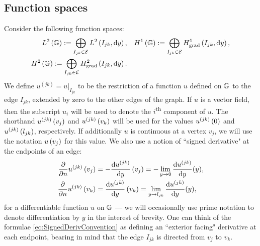 \subsection{Function spaces} \label{ssec:FunctionSpaces}
Consider the following function spaces:
\begin{subequations} \label{eq:GraphFuncSpaces}
	\begin{align}
		L^2\left( \mathbb{G} \right) := \bigoplus_{I_{jk}\in \mathcal{E}} L^{2}\left( I_{jk},\mathrm{d}y \right),
		&\quad H^1\left( \mathbb{G} \right) := \bigoplus_{I_{jk}\in \mathcal{E}} H^1_\mathrm{grad}\left( I_{jk}, \mathrm{d}y \right), \\
		H^2\left( \mathbb{G} \right) := \bigoplus_{I_{jk}\in \mathcal{E}} H^2_\mathrm{grad}\left( I_{jk}, \mathrm{d} y \right). &
	\end{align}
\end{subequations}
We define $u^{(jk)} = u\vert_{I_{jk}}$ to be the restriction of a function $u$ defined on $\mathbb{G}$ to the edge $I_{jk}$, extended by zero to the other edges of the graph. 
If $u$ is a vector field, then the subscript $u_{i}$ will be used to denote the $i$\textsuperscript{th} component of $u$.
The shorthand $u^{(jk)}\left( v_j \right)$ and $u^{(jk)}\left( v_k \right)$ will be used for the values $u^{(jk)}\left( 0 \right)$ and $u^{(jk)}\left( l_{jk} \right)$, respectively.
If additionally $u$ is continuous at a vertex $v_j$, we will use the notation $u\left( v_j \right)$ for this value.
We also use a notion of ``signed derivative" at the endpoints of an edge:
\begin{subequations} \label{eq:SignedDerivConvention}
	\begin{align}
		\dfrac{\partial }{\partial n}u^{(jk)}\left( v_j \right) &= -\dfrac{\mathrm{d}u^{(jk)}}{\mathrm{d}y}\left( v_j \right) = -\lim_{y\rightarrow0}\dfrac{\mathrm{d}u^{(jk)}}{\mathrm{d}y}(y), \\
		\dfrac{\partial }{\partial n}u^{(jk)}\left( v_k \right) &= \dfrac{\mathrm{d}u^{(jk)}}{\mathrm{d}y}\left( v_k \right) = \lim_{y\rightarrow l_{jk}}\dfrac{\mathrm{d}u^{(jk)}}{\mathrm{d}y}(y),
	\end{align}
\end{subequations}
for a differentiable function $u$ on $\mathbb{G}$ --- we will occasionally use prime notation to denote differentiation by $y$ in the interest of brevity.
One can think of the formulae \eqref{eq:SignedDerivConvention} as defining an ``exterior facing" derivative at each endpoint, bearing in mind that the edge $I_{jk}$ is directed from $v_j$ to $v_k$.

